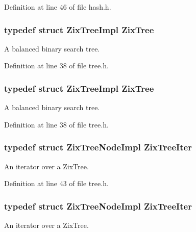 Definition at line 46 of file hash.\+h.

\subsubsection[{\texorpdfstring{Zix\+Tree}{ZixTree}}]{\setlength{\rightskip}{0pt plus 5cm}typedef struct {\bf Zix\+Tree\+Impl} {\bf Zix\+Tree}}\hypertarget{group__zix_ga684b19fdde4e1e069abd68304fa9518c}{}\label{group__zix_ga684b19fdde4e1e069abd68304fa9518c}
A balanced binary search tree. 

Definition at line 38 of file tree.\+h.

\subsubsection[{\texorpdfstring{Zix\+Tree}{ZixTree}}]{\setlength{\rightskip}{0pt plus 5cm}typedef struct {\bf Zix\+Tree\+Impl} {\bf Zix\+Tree}}\hypertarget{group__zix_ga684b19fdde4e1e069abd68304fa9518c}{}\label{group__zix_ga684b19fdde4e1e069abd68304fa9518c}
A balanced binary search tree. 

Definition at line 38 of file tree.\+h.

\subsubsection[{\texorpdfstring{Zix\+Tree\+Iter}{ZixTreeIter}}]{\setlength{\rightskip}{0pt plus 5cm}typedef struct {\bf Zix\+Tree\+Node\+Impl} {\bf Zix\+Tree\+Iter}}\hypertarget{group__zix_gad5034843cec6bf6ebbdc5b5fda7b112e}{}\label{group__zix_gad5034843cec6bf6ebbdc5b5fda7b112e}
An iterator over a Zix\+Tree. 

Definition at line 43 of file tree.\+h.

\subsubsection[{\texorpdfstring{Zix\+Tree\+Iter}{ZixTreeIter}}]{\setlength{\rightskip}{0pt plus 5cm}typedef struct {\bf Zix\+Tree\+Node\+Impl} {\bf Zix\+Tree\+Iter}}\hypertarget{group__zix_gad5034843cec6bf6ebbdc5b5fda7b112e}{}\label{group__zix_gad5034843cec6bf6ebbdc5b5fda7b112e}
An iterator over a Zix\+Tree. 

